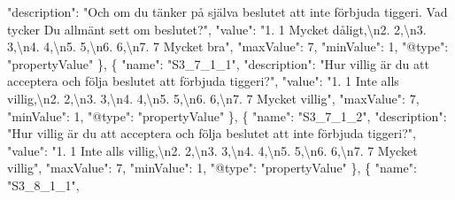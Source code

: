 \documentclass[
]{book}
\newenvironment{Shaded}{\begin{snugshade}}{\end{snugshade}}
\newcommand{\CharTok}[1]{\textcolor[rgb]{0.31,0.60,0.02}{#1}}
\newcommand{\DataTypeTok}[1]{\textcolor[rgb]{0.13,0.29,0.53}{#1}}
\newcommand{\DecValTok}[1]{\textcolor[rgb]{0.00,0.00,0.81}{#1}}
\newcommand{\FunctionTok}[1]{\textcolor[rgb]{0.00,0.00,0.00}{#1}}
\newcommand{\OtherTok}[1]{\textcolor[rgb]{0.56,0.35,0.01}{#1}}
\newcommand{\StringTok}[1]{\textcolor[rgb]{0.31,0.60,0.02}{#1}}
\begin{document}
\begin{Shaded}
\begin{Highlighting}[]
      \DataTypeTok{"description"}\FunctionTok{:} \StringTok{"Och om du tänker på själva beslutet att inte förbjuda tiggeri. Vad tycker Du allmänt sett om beslutet?"}\FunctionTok{,}
      \DataTypeTok{"value"}\FunctionTok{:} \StringTok{"1. 1 Mycket dåligt,}\CharTok{\textbackslash{}n}\StringTok{2. 2,}\CharTok{\textbackslash{}n}\StringTok{3. 3,}\CharTok{\textbackslash{}n}\StringTok{4. 4,}\CharTok{\textbackslash{}n}\StringTok{5. 5,}\CharTok{\textbackslash{}n}\StringTok{6. 6,}\CharTok{\textbackslash{}n}\StringTok{7. 7 Mycket bra"}\FunctionTok{,}
      \DataTypeTok{"maxValue"}\FunctionTok{:} \DecValTok{7}\FunctionTok{,}
      \DataTypeTok{"minValue"}\FunctionTok{:} \DecValTok{1}\FunctionTok{,}
      \DataTypeTok{"@type"}\FunctionTok{:} \StringTok{"propertyValue"}
    \FunctionTok{\}}\OtherTok{,}
    \FunctionTok{\{}
      \DataTypeTok{"name"}\FunctionTok{:} \StringTok{"S3_7_1_1"}\FunctionTok{,}
      \DataTypeTok{"description"}\FunctionTok{:} \StringTok{"Hur villig är du att acceptera och följa beslutet att förbjuda tiggeri?"}\FunctionTok{,}
      \DataTypeTok{"value"}\FunctionTok{:} \StringTok{"1. 1 Inte alls villig,}\CharTok{\textbackslash{}n}\StringTok{2. 2,}\CharTok{\textbackslash{}n}\StringTok{3. 3,}\CharTok{\textbackslash{}n}\StringTok{4. 4,}\CharTok{\textbackslash{}n}\StringTok{5. 5,}\CharTok{\textbackslash{}n}\StringTok{6. 6,}\CharTok{\textbackslash{}n}\StringTok{7. 7 Mycket villig"}\FunctionTok{,}
      \DataTypeTok{"maxValue"}\FunctionTok{:} \DecValTok{7}\FunctionTok{,}
      \DataTypeTok{"minValue"}\FunctionTok{:} \DecValTok{1}\FunctionTok{,}
      \DataTypeTok{"@type"}\FunctionTok{:} \StringTok{"propertyValue"}
    \FunctionTok{\}}\OtherTok{,}
    \FunctionTok{\{}
      \DataTypeTok{"name"}\FunctionTok{:} \StringTok{"S3_7_1_2"}\FunctionTok{,}
      \DataTypeTok{"description"}\FunctionTok{:} \StringTok{"Hur villig är du att acceptera och följa beslutet att inte förbjuda tiggeri?"}\FunctionTok{,}
      \DataTypeTok{"value"}\FunctionTok{:} \StringTok{"1. 1 Inte alls villig,}\CharTok{\textbackslash{}n}\StringTok{2. 2,}\CharTok{\textbackslash{}n}\StringTok{3. 3,}\CharTok{\textbackslash{}n}\StringTok{4. 4,}\CharTok{\textbackslash{}n}\StringTok{5. 5,}\CharTok{\textbackslash{}n}\StringTok{6. 6,}\CharTok{\textbackslash{}n}\StringTok{7. 7 Mycket villig"}\FunctionTok{,}
      \DataTypeTok{"maxValue"}\FunctionTok{:} \DecValTok{7}\FunctionTok{,}
      \DataTypeTok{"minValue"}\FunctionTok{:} \DecValTok{1}\FunctionTok{,}
      \DataTypeTok{"@type"}\FunctionTok{:} \StringTok{"propertyValue"}
    \FunctionTok{\}}\OtherTok{,}
    \FunctionTok{\{}
      \DataTypeTok{"name"}\FunctionTok{:} \StringTok{"S3_8_1_1"}\FunctionTok{,}

\end{Highlighting}
\end{Shaded}
\end{document}
